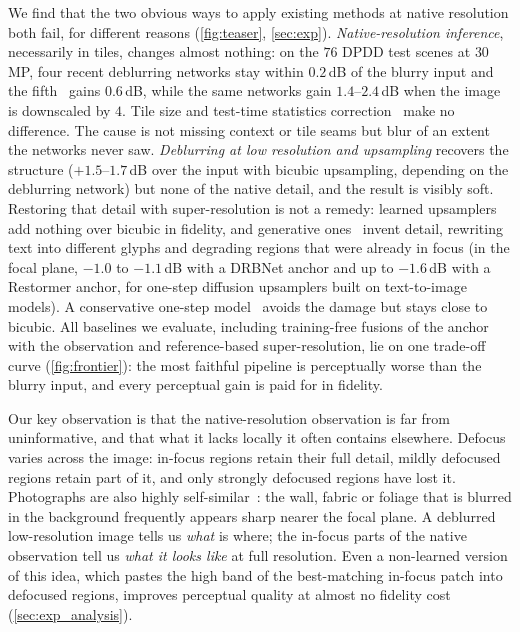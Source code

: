 We find that the two obvious ways to apply existing methods at native resolution both fail, for
different reasons (\cref{fig:teaser}, \cref{sec:exp}).
\emph{Native-resolution inference}, necessarily in tiles, changes almost nothing: on the $76$ DPDD
test scenes at $30$\,MP, four recent deblurring networks stay within $0.2$\,dB of the blurry input
and the fifth~\cite{seizinger2025bokehlicious} gains $0.6$\,dB, while the same networks gain
$1.4$--$2.4$\,dB when the image is downscaled by $4$. Tile size and test-time statistics
correction~\cite{chu2022tlc} make no difference. The cause is not missing context or tile seams but
blur of an extent the networks never saw.
\emph{Deblurring at low resolution and upsampling} recovers the structure ($+1.5$--$1.7$\,dB over the
input with bicubic upsampling, depending on the deblurring network) but none of the native detail, and the result is visibly soft.
Restoring that detail with super-resolution is not a remedy: learned upsamplers add nothing over
bicubic in fidelity, and generative ones~\cite{wang2024stablesr,yu2024supir,wu2024osediff,zhang2024s3diff}
invent detail, rewriting text into different glyphs and degrading regions that were already in focus
(in the focal plane, $-1.0$ to $-1.1$\,dB with a DRBNet anchor and up to $-1.6$\,dB with a
Restormer anchor, for one-step diffusion upsamplers built on text-to-image models). A conservative one-step model~\cite{wu2026vosr} avoids the damage but stays close to bicubic.
All baselines we evaluate, including training-free fusions of the anchor with the observation and
reference-based super-resolution, lie on one trade-off curve (\cref{fig:frontier}): the most
faithful pipeline is perceptually worse than the blurry input, and every perceptual gain is paid
for in fidelity.

Our key observation is that the native-resolution observation is far from uninformative, and that
what it lacks locally it often contains elsewhere. Defocus varies across the image: in-focus regions
retain their full detail, mildly defocused regions retain part of it, and only strongly defocused
regions have lost it. Photographs are also highly self-similar~\cite{glasner2009single,zontak2011internal}:
the wall, fabric or foliage that is blurred in the background frequently appears sharp nearer the
focal plane. A deblurred low-resolution image tells us \emph{what} is where; the in-focus parts of
the native observation tell us \emph{what it looks like} at full resolution. Even a non-learned
version of this idea, which pastes the high band of the best-matching in-focus patch into defocused
regions, improves perceptual quality at almost no fidelity cost (\cref{sec:exp_analysis}).

